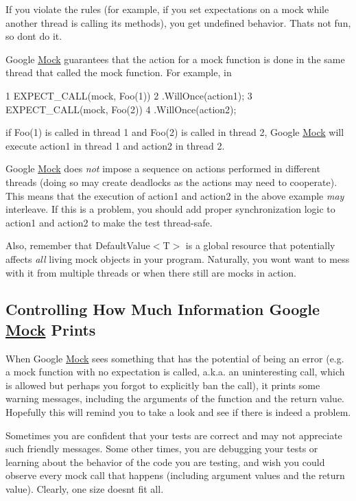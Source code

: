 If you violate the rules (for example, if you set expectations on a mock while another thread is calling its methods), you get undefined behavior. That\textquotesingle{}s not fun, so don\textquotesingle{}t do it.

Google \hyperlink{classMock}{Mock} guarantees that the action for a mock function is done in the same thread that called the mock function. For example, in


\begin{DoxyCode}
1 EXPECT\_CALL(mock, Foo(1))
2     .WillOnce(action1);
3 EXPECT\_CALL(mock, Foo(2))
4     .WillOnce(action2);
\end{DoxyCode}


if {\ttfamily Foo(1)} is called in thread 1 and {\ttfamily Foo(2)} is called in thread 2, Google \hyperlink{classMock}{Mock} will execute {\ttfamily action1} in thread 1 and {\ttfamily action2} in thread 2.

Google \hyperlink{classMock}{Mock} does {\itshape not} impose a sequence on actions performed in different threads (doing so may create deadlocks as the actions may need to cooperate). This means that the execution of {\ttfamily action1} and {\ttfamily action2} in the above example {\itshape may} interleave. If this is a problem, you should add proper synchronization logic to {\ttfamily action1} and {\ttfamily action2} to make the test thread-\/safe.

Also, remember that {\ttfamily Default\+Value$<$T$>$} is a global resource that potentially affects {\itshape all} living mock objects in your program. Naturally, you won\textquotesingle{}t want to mess with it from multiple threads or when there still are mocks in action.

\subsection*{Controlling How Much Information Google \hyperlink{classMock}{Mock} Prints}

When Google \hyperlink{classMock}{Mock} sees something that has the potential of being an error (e.\+g. a mock function with no expectation is called, a.\+k.\+a. an uninteresting call, which is allowed but perhaps you forgot to explicitly ban the call), it prints some warning messages, including the arguments of the function and the return value. Hopefully this will remind you to take a look and see if there is indeed a problem.

Sometimes you are confident that your tests are correct and may not appreciate such friendly messages. Some other times, you are debugging your tests or learning about the behavior of the code you are testing, and wish you could observe every mock call that happens (including argument values and the return value). Clearly, one size doesn\textquotesingle{}t fit all.

